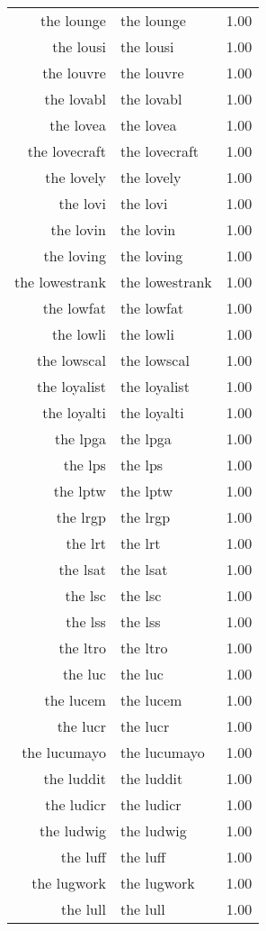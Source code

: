 \begin{table}[ht]
\begin{tabular}{rlr}
  the lounge & the lounge & 1.00 \\ 
  the lousi & the lousi & 1.00 \\ 
  the louvre & the louvre & 1.00 \\ 
  the lovabl & the lovabl & 1.00 \\ 
  the lovea & the lovea & 1.00 \\ 
  the lovecraft & the lovecraft & 1.00 \\ 
  the lovely & the lovely & 1.00 \\ 
  the lovi & the lovi & 1.00 \\ 
  the lovin & the lovin & 1.00 \\ 
  the loving & the loving & 1.00 \\ 
  the lowestrank & the lowestrank & 1.00 \\ 
  the lowfat & the lowfat & 1.00 \\ 
  the lowli & the lowli & 1.00 \\ 
  the lowscal & the lowscal & 1.00 \\ 
  the loyalist & the loyalist & 1.00 \\ 
  the loyalti & the loyalti & 1.00 \\ 
  the lpga & the lpga & 1.00 \\ 
  the lps & the lps & 1.00 \\ 
  the lptw & the lptw & 1.00 \\ 
  the lrgp & the lrgp & 1.00 \\ 
  the lrt & the lrt & 1.00 \\ 
  the lsat & the lsat & 1.00 \\ 
  the lsc & the lsc & 1.00 \\ 
  the lss & the lss & 1.00 \\ 
  the ltro & the ltro & 1.00 \\ 
  the luc & the luc & 1.00 \\ 
  the lucem & the lucem & 1.00 \\ 
  the lucr & the lucr & 1.00 \\ 
  the lucumayo & the lucumayo & 1.00 \\ 
  the luddit & the luddit & 1.00 \\ 
  the ludicr & the ludicr & 1.00 \\ 
  the ludwig & the ludwig & 1.00 \\ 
  the luff & the luff & 1.00 \\ 
  the lugwork & the lugwork & 1.00 \\ 
  the lull & the lull & 1.00 \\ 

\end{tabular}
\end{table}
